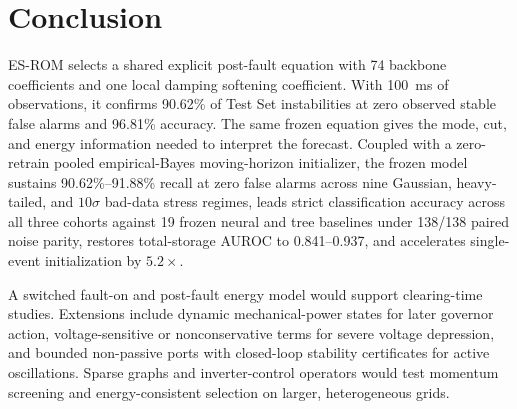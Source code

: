 \documentclass[journal]{IEEEtran}
\begin{document}
\section{Conclusion}
\label{sec:conclusion}
ES-ROM selects a shared explicit post-fault equation with 74 backbone
coefficients and one local damping softening coefficient. With 100~ms
of observations, it confirms 90.62\% of Test Set instabilities at
zero observed stable false alarms and 96.81\% accuracy. The same
frozen equation gives the mode, cut, and energy information needed
to interpret the forecast. Coupled with a zero-retrain pooled empirical-Bayes
moving-horizon initializer, the frozen model sustains 90.62\%--91.88\% recall
at zero false alarms across nine Gaussian, heavy-tailed, and \(10\sigma\)
bad-data stress regimes, leads strict classification accuracy across all
three cohorts against 19 frozen neural and tree baselines under 138/138
paired noise parity, restores total-storage AUROC to 0.841--0.937, and
accelerates single-event initialization by \(5.2\times\).

A switched fault-on and post-fault energy model would support
clearing-time studies. Extensions include dynamic mechanical-power
states for later governor action, voltage-sensitive or nonconservative
terms for severe voltage depression, and bounded non-passive ports with
closed-loop stability certificates for active oscillations. Sparse
graphs and inverter-control operators would test momentum screening
and energy-consistent selection on larger, heterogeneous grids.



\end{document}
